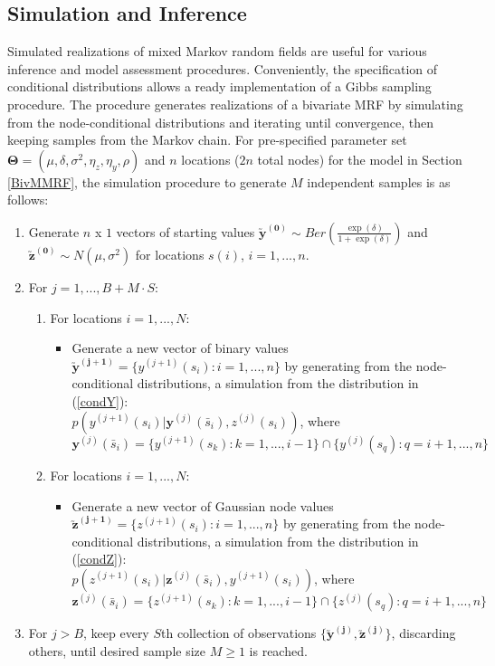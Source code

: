 \documentclass[12pt, a4paper, twoside]{article}
\begin{document}
\subsection{Simulation and Inference}
\label{SimInf}
Simulated realizations of mixed Markov random fields are useful for various inference and model assessment procedures. Conveniently, the specification of conditional distributions allows a ready implementation of a Gibbs sampling procedure. The procedure generates realizations of a bivariate MRF by simulating from the node-conditional distributions and iterating until convergence, then keeping samples from the Markov chain. For pre-specified parameter set $\boldsymbol{\Theta} = (\mu,\delta,\sigma^2,\eta_z,\eta_y,\rho)$ and $n$ locations ($2n$ total nodes) for the model in Section \ref{BivMMRF}, the simulation procedure to generate $M$ independent samples is as follows:
\begin{enumerate}
	\item Generate $n$ x $1$ vectors of starting values $\boldsymbol{\utilde{y}^{(0)}} \sim Ber(\frac{\exp{(\delta)}}{1+\exp{(\delta)}})$ and $\boldsymbol{\utilde{z}^{(0)}} \sim N(\mu, \sigma^2)$ for locations $s(i)$, $i=1,...,n$.
	\item For $j=1,...,B+M\cdot S$:
	\begin{enumerate}[label=(\alph*)]
	\item For locations $i=1,...,N$:
	\begin{itemize}
	\item Generate a new vector of binary values $\boldsymbol{\utilde{y}^{(j+1)}} = \lbrace y^{(j+1)}(s_i):i=1,...,n\rbrace$ by generating from the node-conditional distributions, a simulation from the distribution in (\ref{condY}):\\ $p(y^{(j+1)}(s_{i})|\boldsymbol{y}^{(j)}(\bar{s}_i), z^{(j)}(s_{i}))$, where\\ $\boldsymbol{y}^{(j)}(\bar{s}_i) = \lbrace y^{(j+1)}(s_k): k= 1,...,i-1\rbrace\cap \lbrace y^{(j)}(s_q): q= i+1,...,n\rbrace$
		\end{itemize}
	\item For locations $i=1,...,N$:
	\begin{itemize}
	\item Generate a new vector of Gaussian node values $\boldsymbol{\utilde{z}^{(j+1)}} = \lbrace z^{(j+1)}(s_i):i=1,...,n\rbrace$ by generating from the node-conditional distributions, a simulation from the distribution in (\ref{condZ}):\\
	$p(z^{(j+1)}(s_{i})|\boldsymbol{z}^{(j)}(\bar{s}_i) , y^{(j+1)}(s_{i}))$, where\\ $\boldsymbol{z}^{(j)}(\bar{s}_i) = \lbrace z^{(j+1)}(s_k): k= 1,...,i-1\rbrace\cap \lbrace z^{(j)}(s_q): q= i+1,...,n\rbrace$
	\end{itemize}
\end{enumerate}
\item For $j > B$, keep every $S$th collection of observations $\lbrace\boldsymbol{\utilde{y}^{(j)}}, \boldsymbol{\utilde{z}^{(j)}}\rbrace$, discarding others, until desired sample size $M\geq1$ is reached.

\end{enumerate}
\end{document}

